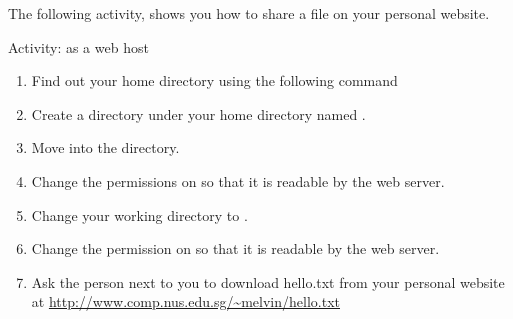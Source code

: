 The following activity, shows you how to share a file on your personal website.  

\begin{frame}[allowframebreaks=0.6]{Activity:  as a web host}
\begin{enumerate}
\item Find out your home directory using the following command
\item Create a directory under your home directory named
. 
\item Move  into the  directory. 
\item Change the permissions on  so that it is readable by
the web server. 
\item Change your working directory to . 
\item Change the permission on  so that it is readable by the
web server.  
\item Ask the person next to you to download hello.txt from your personal
website at \url{http://www.comp.nus.edu.sg/~melvin/hello.txt}
\end{enumerate}
\end{frame}







